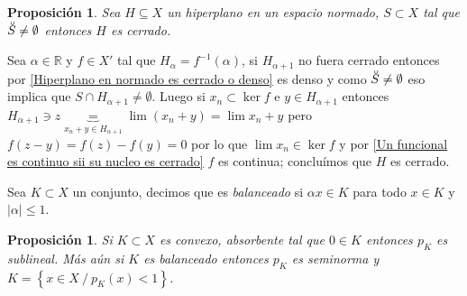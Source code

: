 \documentclass[11pt]{article}
\newcommand{\R}{{\mathbb{R}}}
\newcommand{\abs}[1]{\left\lvert#1\right\rvert}
\newcommand{\sett}[1]{\left\lbrace#1\right\rbrace}
\newcommand{\interior}[1]{\accentset{\smash{\raisebox{-0.12ex}{$\scriptstyle\circ$}}}{#1}\rule{0pt}{2.3ex}}
\numberwithin{theorem}{subsection}
\newtheorem{proposition}[theorem]{Proposici\'on}
\newenvironment{proof}[1][Demostraci\'on]{\begin{trivlist}
		\item[\hskip \labelsep {\bfseries #1}]}{\end{trivlist}}
\newenvironment{definition}[1][Definici\'on]{\begin{trivlist}
		\item[\hskip \labelsep {\bfseries #1}]}{\end{trivlist}}
\newcommand{\qed}{\nobreak \ifvmode \relax \else
	\ifdim\lastskip<1.5em \hskip-\lastskip
	\hskip1.5em plus0em minus0.5em \fi \nobreak
	\vrule height0.75em width0.5em depth0.25em\fi}
\begin{document}
\begin{proposition}
	\label{Lemma3: Hanh-Banach geometrico}
	Sea $H \subseteq X$ un hiperplano en un espacio normado, $S \subset X$ tal que $\interior{S} \neq \emptyset$ entonces $H$ es cerrado.
\end{proposition}

\begin{proof}
	Sea $\alpha \in \R$ y $f \in X'$ tal que $H_{\alpha} = f^{-1}(\alpha)$, si $H_{\alpha+1}$ no fuera cerrado entonces por \ref{Hiperplano en normado es cerrado o denso} es denso y como $\interior{S} \neq \emptyset$ eso implica que $S \cap H_{\alpha +1} \neq \emptyset$. Luego si $x_n \subset \ker f$ e $y \in H_{\alpha +1}$ entonces $H_{\alpha +1} \ni z \underbrace{=}_{x_n + y \in H_{\alpha + 1}} \lim \left(x_n + y\right) = \lim x_n + y$ pero $f(z-y) = f(z) - f(y) = 0$ por lo que $\lim x_n \in \ker f$ y por \ref{Un funcional es continuo sii su nucleo es cerrado} $f$ es continua; conclu\'imos que $H$ es cerrado. \qed
\end{proof}

\begin{definition}
	Sea $K \subset X$ un conjunto, decimos que es \textit{balanceado} si $\alpha x \in K$ para todo $x \in K$ y $\abs{\alpha} \leq 1$.
\end{definition}

\begin{proposition}
	\label{Lemma4: Hanh-Banach geometrico}
	Si $K \subset X$ es convexo, absorbente tal que $0 \in K$ entonces $p_K$ es sublineal. M\'as a\'un si $K$ es balanceado entonces $p_K$ es seminorma y $K = \sett{x \in X \ / \ p_K(x) < 1}$.
\end{proposition}
\end{document}
